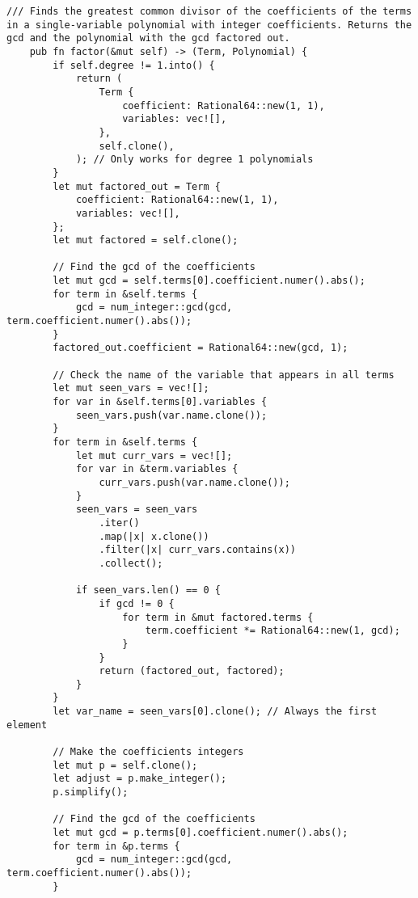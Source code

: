 \begin{lstlisting}[caption={The implementation of the \texttt{factor()} method for the \texttt{Polynomial} struct}, label={lst:polynomial-factor}]
    /// Finds the greatest common divisor of the coefficients of the terms in a single-variable polynomial with integer coefficients. Returns the gcd and the polynomial with the gcd factored out.
    pub fn factor(&mut self) -> (Term, Polynomial) {
        if self.degree != 1.into() {
            return (
                Term {
                    coefficient: Rational64::new(1, 1),
                    variables: vec![],
                },
                self.clone(),
            ); // Only works for degree 1 polynomials
        }
        let mut factored_out = Term {
            coefficient: Rational64::new(1, 1),
            variables: vec![],
        };
        let mut factored = self.clone();

        // Find the gcd of the coefficients
        let mut gcd = self.terms[0].coefficient.numer().abs();
        for term in &self.terms {
            gcd = num_integer::gcd(gcd, term.coefficient.numer().abs());
        }
        factored_out.coefficient = Rational64::new(gcd, 1);

        // Check the name of the variable that appears in all terms
        let mut seen_vars = vec![];
        for var in &self.terms[0].variables {
            seen_vars.push(var.name.clone());
        }
        for term in &self.terms {
            let mut curr_vars = vec![];
            for var in &term.variables {
                curr_vars.push(var.name.clone());
            }
            seen_vars = seen_vars
                .iter()
                .map(|x| x.clone())
                .filter(|x| curr_vars.contains(x))
                .collect();

            if seen_vars.len() == 0 {
                if gcd != 0 {
                    for term in &mut factored.terms {
                        term.coefficient *= Rational64::new(1, gcd);
                    }
                }
                return (factored_out, factored);
            }
        }
        let var_name = seen_vars[0].clone(); // Always the first element

        // Make the coefficients integers
        let mut p = self.clone();
        let adjust = p.make_integer();
        p.simplify();

        // Find the gcd of the coefficients
        let mut gcd = p.terms[0].coefficient.numer().abs();
        for term in &p.terms {
            gcd = num_integer::gcd(gcd, term.coefficient.numer().abs());
        }


\end{lstlisting}
